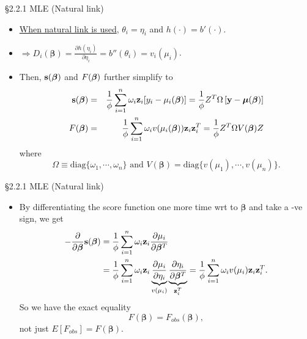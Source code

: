 \documentclass{beamer}
\newcommand{\boldbeta}{{\boldsymbol \beta}}
\newenvironment{wideitemize}%
  {\begin{itemize}%
    \setlength{\parskip}{1em}}%
  {\end{itemize}}
\begin{document}
\begin{frame}{\S2.2.1 MLE (Natural link)}
\begin{wideitemize}
\item
\underline{When natural link is used},  $\theta_i = \eta_i$ and $h(\cdot) = b'(\cdot)$.

\item $\Rightarrow D_i (\boldbeta) = \frac{\partial h(\eta_i)}{\partial \eta_i}  = b''(\theta_i) = v_i (\mu_i)$.

\item Then,  $\textbf{s}(\mbox{\boldmath $\beta$})$ and $F(\mbox{\boldmath $\beta$})$ further
simplify to
\begin{eqnarray*}
\textbf{s}(\mbox{\boldmath $\beta$})&= & \frac{1}{\phi}\sum_{i=1}^n \omega_i\textbf{z}_i
[y_i-\mu_i(\mbox{\boldmath $\beta$})]=\frac{1}{\phi}Z^T\Omega \left[\textbf{y}-\mbox{\boldmath $\mu$}
(\mbox{\boldmath $\beta$})\right] \\
F(\mbox{\boldmath $\beta$}) &= & \frac{1}{\phi}\sum_{i=1}^n \omega_iv(\mu_i(\mbox{\boldmath $\beta$}))
\textbf{z}_i\textbf{z}_i^T=\frac{1}{\phi}Z^T\Omega V(\mbox{\boldmath $\beta$})Z
\end{eqnarray*}
where 
\begin{equation*}
\Omega \equiv \text{diag}\{\omega_1,\cdots,\omega_n\}  \text{ and }
V({\boldbeta})
=\text{diag}\{v(\mu_1),\cdots, v(\mu_n)\}.
\end{equation*}




\end{wideitemize}
\end{frame}


\begin{frame}{\S2.2.1 MLE (Natural link)}

\begin{itemize}
\item By differentiating the score function one more time wrt to ${\boldsymbol \beta}$ and take a -ve sign, we 
get
\begin{align*}
- \frac{\partial }{ \partial {\boldsymbol \beta}} {\bf s}({\boldsymbol \beta}) &=  \frac{1}{\phi} \sum_{i=1}^n \omega_i {\bf z}_i \frac{\partial \mu_i}{\partial {\boldsymbol \beta}^T} \\
&=  \frac{1}{\phi} \sum_{i=1}^n \omega_i {\bf z}_i  \underbrace{\frac{\partial \mu_i}{\partial \eta_i}}_{v(\mu_i)}  \underbrace{ \frac{\partial \eta_i}{\partial {\boldsymbol \beta}^T} }_{{\bf z}_i^T }  = \frac{1}{\phi} \sum_{i=1}^n \omega_i  v(\mu_i) {\bf z}_i   {\bf z}_i^T.
\end{align*}
So we
have the exact equality
\[
F({\boldsymbol \beta}) = F_{obs}({\boldsymbol \beta}),
\]
not just $E[F_{obs}] = F({\boldsymbol \beta})$. 

\end{itemize}

\end{frame}
\end{document}
